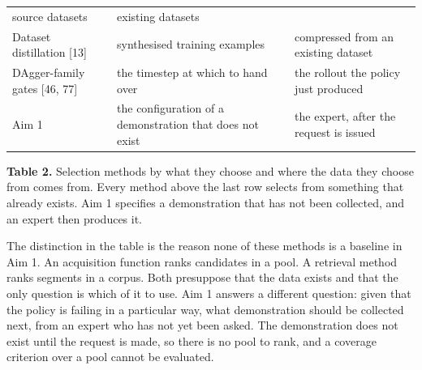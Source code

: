 \documentclass[
  11pt,
]{article}
\begin{document}
\begin{longtable}[]{@{}lll@{}}
\begin{minipage}[t]{0.30\columnwidth}
source datasets\strut
\end{minipage} & \begin{minipage}[t]{0.30\columnwidth}\raggedright
existing datasets\strut
\end{minipage}\tabularnewline
\begin{minipage}[t]{0.30\columnwidth}\raggedright
Dataset distillation {[}13{]}\strut
\end{minipage} & \begin{minipage}[t]{0.30\columnwidth}\raggedright
synthesised training examples\strut
\end{minipage} & \begin{minipage}[t]{0.30\columnwidth}\raggedright
compressed from an existing dataset\strut
\end{minipage}\tabularnewline
\begin{minipage}[t]{0.30\columnwidth}\raggedright
DAgger-family gates {[}46, 77{]}\strut
\end{minipage} & \begin{minipage}[t]{0.30\columnwidth}\raggedright
the timestep at which to hand over\strut
\end{minipage} & \begin{minipage}[t]{0.30\columnwidth}\raggedright
the rollout the policy just produced\strut
\end{minipage}\tabularnewline
\begin{minipage}[t]{0.30\columnwidth}\raggedright
Aim 1\strut
\end{minipage} & \begin{minipage}[t]{0.30\columnwidth}\raggedright
the configuration of a demonstration that does not exist\strut
\end{minipage} & \begin{minipage}[t]{0.30\columnwidth}\raggedright
the expert, after the request is issued\strut
\end{minipage}\tabularnewline
\bottomrule
\end{longtable}

\textbf{Table 2.} Selection methods by what they choose and where the
data they choose from comes from. Every method above the last row
selects from something that already exists. Aim 1 specifies a
demonstration that has not been collected, and an expert then produces
it.

The distinction in the table is the reason none of these methods is a
baseline in Aim 1. An acquisition function ranks candidates in a pool. A
retrieval method ranks segments in a corpus. Both presuppose that the
data exists and that the only question is which of it to use. Aim 1
answers a different question: given that the policy is failing in a
particular way, what demonstration should be collected next, from an
expert who has not yet been asked. The demonstration does not exist
until the request is made, so there is no pool to rank, and a coverage
criterion over a pool cannot be evaluated.
\end{document}
